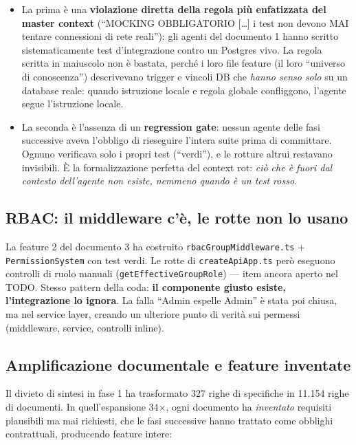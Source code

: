 \documentclass[11pt,a4paper]{article}
\newcommand{\file}[1]{\texttt{\small #1}}
\begin{document}
\begin{itemize}[leftmargin=1.5em]
  \item La prima \`e una \textbf{violazione diretta della regola pi\`u enfatizzata del master context} (``MOCKING OBBLIGATORIO [\dots] i test non devono MAI tentare connessioni di rete reali''): gli agenti del documento 1 hanno scritto sistematicamente test d'integrazione contro un Postgres vivo. La regola scritta in maiuscolo non \`e bastata, perch\'e i loro file feature (il loro ``universo di conoscenza'') descrivevano trigger e vincoli DB che \emph{hanno senso solo} su un database reale: quando istruzione locale e regola globale confliggono, l'agente segue l'istruzione locale.
  \item La seconda \`e l'assenza di un \textbf{regression gate}: nessun agente delle fasi successive aveva l'obbligo di rieseguire l'intera suite prima di committare. Ognuno verificava solo i propri test (``verdi''), e le rotture altrui restavano invisibili. \`E la formalizzazione perfetta del context rot: \emph{ci\`o che \`e fuori dal contesto dell'agente non esiste, nemmeno quando \`e un test rosso}.
\end{itemize}

\subsection{RBAC: il middleware c'\`e, le rotte non lo usano}

La feature 2 del documento 3 ha costruito \file{rbacGroupMiddleware.ts} + \file{PermissionSystem} con test verdi. Le rotte di \file{createApiApp.ts} per\`o eseguono controlli di ruolo manuali (\file{getEffectiveGroupRole}) --- item ancora aperto nel TODO. Stesso pattern della coda: \textbf{il componente giusto esiste, l'integrazione lo ignora}. La falla ``Admin espelle Admin'' \`e stata poi chiusa, ma nel service layer, creando un ulteriore punto di verit\`a sui permessi (middleware, service, controlli inline).

\subsection{Amplificazione documentale e feature inventate}

Il divieto di sintesi in fase 1 ha trasformato 327 righe di specifiche in 11.154 righe di documenti. In quell'espansione 34$\times$, ogni documento ha \emph{inventato} requisiti plausibili ma mai richiesti, che le fasi successive hanno trattato come obblighi contrattuali, producendo feature intere:
\end{document}
